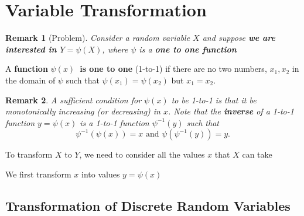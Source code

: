 \documentclass[smaller]{beamer}\usepackage[]{graphicx}\usepackage[]{color}
\newtheorem{remark}{Remark}[section]
\begin{document}
\section{Variable Transformation}

\begin{frame}{\secname}
  \begin{remark}[Problem]
  Consider a random variable $X$ and suppose \textbf{we are interested in $Y=\psi(X)$}, where $\psi $ is a \textbf{
  \textbf{one to one} function}
  \end{remark}
  \pause
  \begin{definition}
  A \textbf{function }$\psi \left( x\right) $\textbf{\ is one to one}
  (1-to-1) if there are no two numbers, $x_{1},x_{2}$ in the domain of $\psi $
  such that $\psi \left( x_{1}\right) =\psi \left( x_{2}\right) $ but $%
  x_{1}= x_{2}$.
  \end{definition}
  \pause
  \begin{remark}
  A sufficient condition for $\psi \left( x\right) $ to be 1-to-1 is
  that it be monotonically increasing (or decreasing) in $x$.
  \bigskip
  \pause
  Note that the \textbf{inverse} of a 1-to-1 function $y=\psi \left(
  x\right) $ is a 1-to-1 function $\psi^{-1}\left( y\right) $ such that
  \begin{equation*}
  \psi ^{-1}\left( \psi \left( x\right) \right) =x\text{ and }\psi \left( \psi
  ^{-1}\left( y\right) \right) =y.
  \end{equation*}
  \end{remark}

  To transform $X$ to $Y$, we need to consider all the values $x$ that $X$ can take

  We first transform $x$ into values $y=\psi (x)$

\end{frame}

\subsection{Transformation of Discrete Random Variables}
\end{document}
